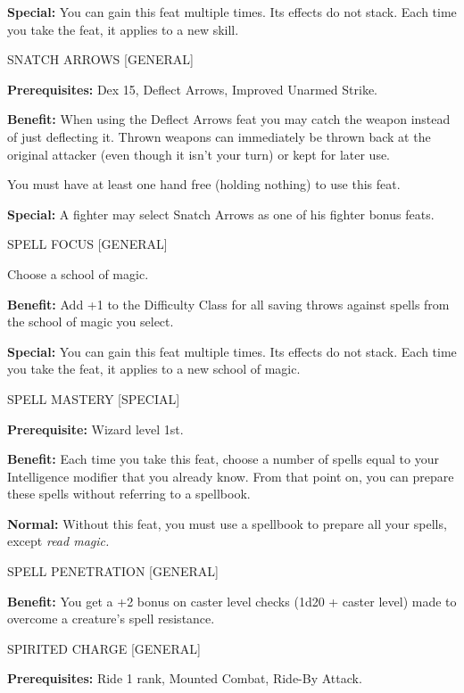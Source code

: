 \documentclass{article}
\begin{document}
\textbf{Special:} You can gain this feat multiple times. Its effects do not stack. 
Each time you take the feat, it applies to a new skill.

\vspace{12pt}
SNATCH ARROWS [GENERAL]

\textbf{Prerequisites:} Dex 15, Deflect Arrows, Improved Unarmed Strike.

\textbf{Benefit:} When using the Deflect Arrows feat you may catch the weapon instead 
of just deflecting it. Thrown weapons can immediately be thrown back at the original 
attacker (even though it isn't your turn) or kept for later use.

You must have at least one hand free (holding nothing) to use this feat.

\textbf{Special:} A fighter may select Snatch Arrows as one of his fighter bonus 
feats.

\vspace{12pt}
SPELL FOCUS [GENERAL]

Choose a school of magic.

\textbf{Benefit:} Add +1 to the Difficulty Class for all saving throws against 
spells from the school of magic you select.

\textbf{Special:} You can gain this feat multiple times. Its effects do not stack. 
Each time you take the feat, it applies to a new school of magic.

\vspace{12pt}
SPELL MASTERY [SPECIAL]

\textbf{Prerequisite: }Wizard level 1st.

\textbf{Benefit:} Each time you take this feat, choose a number of spells equal 
to your Intelligence modifier that you already know. From that point on, you can 
prepare these spells without referring to a spellbook.

\textbf{Normal: }Without this feat, you must use a spellbook to prepare all your 
spells, except \textit{read magic.}

\vspace{12pt}
SPELL PENETRATION [GENERAL]

\textbf{Benefit:} You get a +2 bonus on caster level checks (1d20 + caster level) 
made to overcome a creature's spell resistance.

\vspace{12pt}
SPIRITED CHARGE [GENERAL]

\textbf{Prerequisites:} Ride 1 rank, Mounted Combat, Ride-By Attack.
\end{document}
